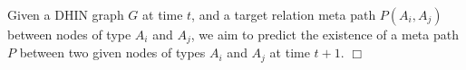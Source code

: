 %
%


\begin{definition}\label{problemdef}
Given a DHIN graph $G$ at time $t$, and a target relation meta path $P(A_i,A_j)$ between nodes of type $A_i$ and $A_j$, we aim to predict the existence of a meta path $P$ between two given nodes of types $A_i$ and $A_j$ at time $t+1$. $\Box$
 \end{definition}

